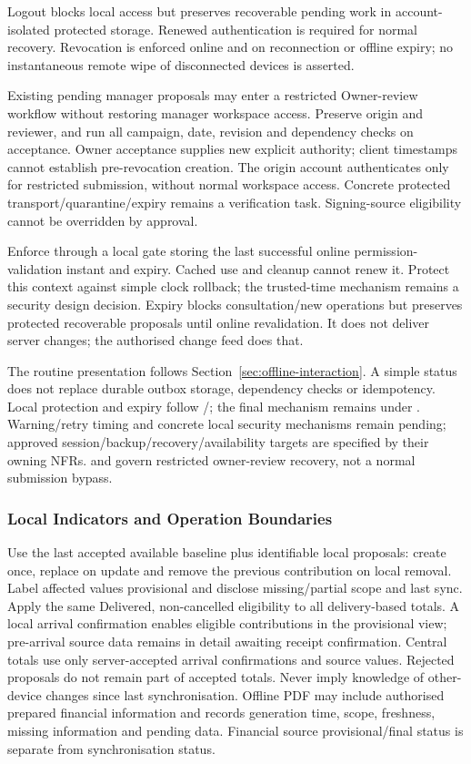 Logout blocks local access but preserves recoverable pending work in account-isolated
protected storage. Renewed authentication is required for normal recovery.
Revocation is enforced online and on reconnection or offline expiry; no instantaneous
remote wipe of disconnected devices is asserted.

Existing pending manager proposals may enter a restricted Owner-review workflow
without restoring manager workspace access. Preserve origin and reviewer, and run
all campaign, date, revision and dependency checks on acceptance. Owner acceptance
supplies new explicit authority; client timestamps cannot establish pre-revocation
creation. The origin account authenticates only for restricted submission, without
normal workspace access. Concrete protected transport/quarantine/expiry remains
a verification task. Signing-source eligibility cannot be overridden by approval.


Enforce \hyperref[br:002]{} through a local gate storing the last successful
online permission-validation instant and expiry. Cached use and cleanup cannot
renew it. Protect this context against simple clock rollback; the trusted-time
mechanism remains a security design decision. Expiry blocks consultation/new
operations but preserves protected recoverable proposals until online revalidation.
It does not deliver server changes; the authorised change feed does that.

The routine presentation follows Section~\ref{sec:offline-interaction}. A simple
status does not replace durable outbox storage, dependency checks or idempotency.
Local protection and expiry follow /; the final mechanism remains
under . Warning/retry timing and concrete local security
mechanisms remain pending; approved session/backup/recovery/availability targets
are specified by their owning NFRs.  and  govern restricted
owner-review recovery, not a normal submission bypass.

\subsubsection{Local Indicators and Operation Boundaries}

Use the last accepted available baseline plus identifiable local proposals: create
once, replace on update and remove the previous contribution on local removal.
Label affected values provisional and disclose missing/partial scope and last sync.
Apply the same Delivered, non-cancelled eligibility to all delivery-based totals.
A local arrival confirmation enables eligible contributions in the provisional
view; pre-arrival source data remains in detail awaiting receipt confirmation.
Central totals use only server-accepted arrival confirmations and source values.
Rejected proposals do not remain part of accepted totals. Never imply knowledge of
other-device changes since last synchronisation. Offline PDF may include authorised prepared financial information and records generation time, scope, freshness, missing information and pending data. Financial source provisional/final status is separate from synchronisation status.



